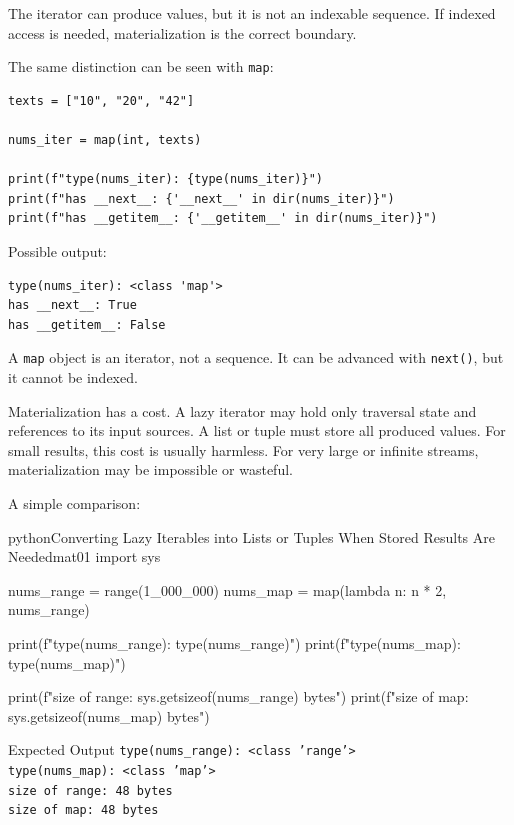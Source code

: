 The iterator can produce values, but it is not an indexable sequence. If indexed access is needed, materialization is the correct boundary.

The same distinction can be seen with \texttt{map}:

\begin{verbatim}
texts = ["10", "20", "42"]

nums_iter = map(int, texts)

print(f"type(nums_iter): {type(nums_iter)}")
print(f"has __next__: {'__next__' in dir(nums_iter)}")
print(f"has __getitem__: {'__getitem__' in dir(nums_iter)}")
\end{verbatim}

Possible output:

\begin{verbatim}
type(nums_iter): <class 'map'>
has __next__: True
has __getitem__: False
\end{verbatim}

A \texttt{map} object is an iterator, not a sequence. It can be advanced with \texttt{next()}, but it cannot be indexed.

Materialization has a cost. A lazy iterator may hold only traversal state and references to its input sources. A list or tuple must store all produced values. For small results, this cost is usually harmless. For very large or infinite streams, materialization may be impossible or wasteful.

A simple comparison:

\begin{codebox}[]{python}{Converting Lazy Iterables into Lists or Tuples When Stored Results Are Needed}{mat01}
import sys

nums_range = range(1_000_000)
nums_map = map(lambda n: n * 2, nums_range)

print(f"type(nums_range): {type(nums_range)}")
print(f"type(nums_map): {type(nums_map)}")

print(f"size of range: {sys.getsizeof(nums_range)} bytes")
print(f"size of map:   {sys.getsizeof(nums_map)} bytes")
\end{codebox}


\begin{iobox}{Expected Output}
\texttt{type(nums\_range): <class 'range'>} \\
\texttt{type(nums\_map): <class 'map'>} \\
\texttt{size of range: 48 bytes} \\
\texttt{size of map:   48 bytes} \\
\end{iobox}


